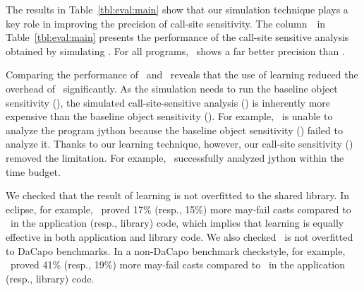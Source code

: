 %
%

The results in Table~\ref{tbl:eval:main} show that our simulation technique plays a key role in improving the precision of call-site sensitivity. %
The column~\oursim~in Table~\ref{tbl:eval:main} presents the
performance of the call-site sensitive analysis obtained by simulating \oneobjHT. For all programs,
\oursim~shows a far better precision than \oneobjHT. 

Comparing the performance of \oursim~and \ours~reveals that 
the use of learning reduced the overhead of \oursim~significantly.  
As the simulation needs to run the baseline object sensitivity (\oneobjHT), the simulated call-site-sensitive analysis (\oursim) is inherently more expensive than the baseline object sensitivity (\oneobjHT). For example, \oursim~is unable to analyze the program jython because the baseline object sensitivity
  (\oneobjHT) failed to analyze it. Thanks to our learning technique, however, our call-site sensitivity (\ours) removed the limitation. For example, \ours~successfully analyzed jython within the time budget.


We checked that the result of learning is not overfitted to the shared library. 
In eclipse, for example, \ours~proved 17\% (resp., 15\%) more may-fail casts compared to \oneobjHT~in the application (resp., library) code, which implies that learning is equally effective in both application and library code. 
We also checked \ours~is not overfitted to DaCapo benchmarks. In a non-DaCapo benchmark checkstyle, for example, \ours~proved 41\% (resp., 19\%) more may-fail casts compared to \oneobjHT~in the application (resp., library) code.

